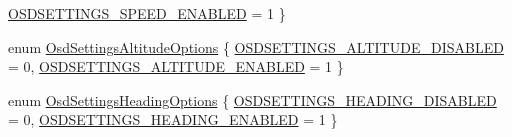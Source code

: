 \begin{DoxyCompactItemize}
\hyperlink{group___osd_settings_gga75920d493f2f5fe4953c2c1beb93c8f5a562550e981134b9a1ba47a2f10e91409}{\-O\-S\-D\-S\-E\-T\-T\-I\-N\-G\-S\-\_\-\-S\-P\-E\-E\-D\-\_\-\-E\-N\-A\-B\-L\-E\-D} = 1
 \}
\item 
enum \hyperlink{group___osd_settings_ga662c877251c2b10a6646adb9e7b440de}{\-Osd\-Settings\-Altitude\-Options} \{ \hyperlink{group___osd_settings_gga662c877251c2b10a6646adb9e7b440dea1ebde0a70add5f739901df5e2e29d1dd}{\-O\-S\-D\-S\-E\-T\-T\-I\-N\-G\-S\-\_\-\-A\-L\-T\-I\-T\-U\-D\-E\-\_\-\-D\-I\-S\-A\-B\-L\-E\-D} = 0, 
\hyperlink{group___osd_settings_gga662c877251c2b10a6646adb9e7b440dea5338a4d6e258e2f84042b1cedcb35cfb}{\-O\-S\-D\-S\-E\-T\-T\-I\-N\-G\-S\-\_\-\-A\-L\-T\-I\-T\-U\-D\-E\-\_\-\-E\-N\-A\-B\-L\-E\-D} = 1
 \}
\item 
enum \hyperlink{group___osd_settings_ga4a6ad9b3b136b2bc0e788d823deee46f}{\-Osd\-Settings\-Heading\-Options} \{ \hyperlink{group___osd_settings_gga4a6ad9b3b136b2bc0e788d823deee46fa949fc7a6b168dbdbb3f85c4583daa036}{\-O\-S\-D\-S\-E\-T\-T\-I\-N\-G\-S\-\_\-\-H\-E\-A\-D\-I\-N\-G\-\_\-\-D\-I\-S\-A\-B\-L\-E\-D} = 0, 
\hyperlink{group___osd_settings_gga4a6ad9b3b136b2bc0e788d823deee46fa8cfef2b18aa227d9c3da7b008eacbeed}{\-O\-S\-D\-S\-E\-T\-T\-I\-N\-G\-S\-\_\-\-H\-E\-A\-D\-I\-N\-G\-\_\-\-E\-N\-A\-B\-L\-E\-D} = 1
 \}
\end{DoxyCompactItemize}

